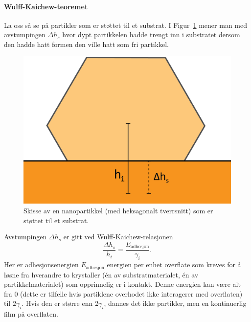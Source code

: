 \paragraph{Wulff-Kaichew-teoremet} La oss så se på partikler som er støttet til et substrat. I Figur~\ref{fig:surface_support} mener man med avstumpingen $\Delta h_s$ hvor dypt partikkelen hadde trengt inn i substratet dersom den hadde hatt formen den ville hatt som fri partikkel.
\begin{figure}[H]
	\bmd\centering
	\includegraphics[width=\linewidth]{surface-01.png}
	\caption{Skisse av en nanopartikkel (med heksagonalt tverrsnitt) som er støttet til et substrat.}
	\label{fig:surface_support}
\emd\end{figure}
Avstumpingen $\Delta h_s$ er gitt ved Wulff-Kaichew-relasjonen
\begin{equation}
	\label{Wulff-Kaichew}
	\frac{\Delta h_s}{h_i} = \frac{E_{\text{adhesjon}}}{\gamma_i}.
\end{equation}
Her er adhesjonsenergien $E_{\text{adhesjon}}$ energien per enhet overflate som kreves for å løsne fra hverandre to krystaller (én av substratmaterialet, én av partikkelmaterialet) som opprinnelig er i kontakt. Denne energien kan være alt fra $0$ (dette er tilfelle hvis partiklene overhodet ikke interagerer med overflaten) til $2\gamma_i$. Hvis den er større enn 2$\gamma_i$, dannes det ikke partikler, men en kontinuerlig film på overflaten.

